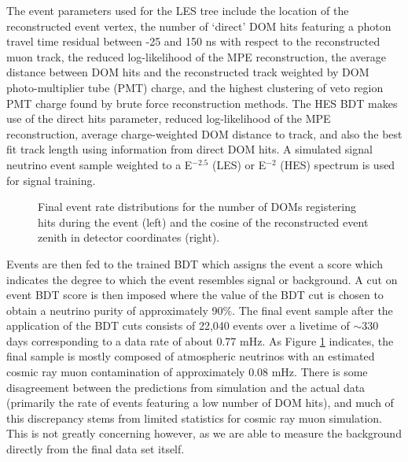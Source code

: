\documentclass[manuscript]{aastex}
\begin{document}
The event parameters used for the LES tree include the location of the reconstructed event vertex, the number of `direct' DOM hits featuring a photon travel time residual between -25 and 150 ns with respect to the reconstructed muon track, the reduced log-likelihood of the MPE reconstruction, the average distance between DOM hits and the reconstructed track weighted by DOM photo-multiplier tube (PMT) charge, and the highest clustering of veto region PMT charge found by brute force reconstruction methods. The HES BDT makes use of the direct hits parameter, reduced log-likelihood of the MPE reconstruction, average charge-weighted DOM distance to track, and also the best fit track length using information from direct DOM hits. A simulated signal neutrino event sample weighted to a E$^{-2.5}$ (LES) or E$^{-2}$ (HES) spectrum is used for signal training.
\begin{figure}[ht]
\caption[Final Sample Event Parameter Distributions]{Final event rate distributions for the number of DOMs registering hits during the event (left) and the cosine of the reconstructed event zenith in detector coordinates (right).}
\label{fig:PostBDTDistributions}
\end{figure}

Events are then fed to the trained BDT which assigns the event a score which indicates the degree to which the event resembles signal or background. A cut on event BDT score is then imposed where the value of the BDT cut is chosen to obtain a neutrino purity of approximately 90$\%$. The final event sample after the application of the BDT cuts consists of 22,040 events over a livetime of $\sim$330 days corresponding to a data rate of about 0.77 mHz. As Figure \ref{fig:PostBDTDistributions} indicates, the final sample is mostly composed of atmospheric neutrinos with an estimated cosmic ray muon contamination of approximately 0.08 mHz. There is some disagreement between the predictions from simulation and the actual data (primarily the rate of events featuring a low number of DOM hits), and much of this discrepancy stems from limited statistics for cosmic ray muon simulation. This is not greatly concerning however, as we are able to measure the background directly from the final data set itself. 

\end{document}
